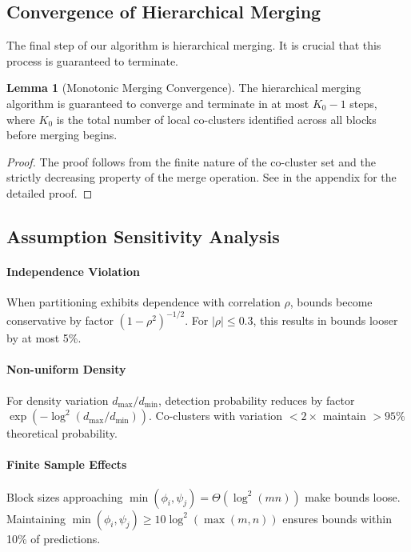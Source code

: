 \documentclass[journal]{IEEEtran}
\theoremstyle{definition}
\newtheorem{lemma}[theorem]{Lemma}
\theoremstyle{remark} %
\begin{document}
{\subsection{Convergence of Hierarchical Merging}
\label{subsec:convergence-of-hierarchical-merging}
The final step of our algorithm is hierarchical merging. It is crucial that this process is guaranteed to terminate.

\begin{lemma}[Monotonic Merging Convergence]
    \label{lem:merging-convergence}
    The hierarchical merging algorithm is guaranteed to converge and terminate in at most $K_0 - 1$ steps, where $K_0$ is the total number of local co-clusters identified across all blocks before merging begins.
\end{lemma}
\begin{proof}
    The proof follows from the finite nature of the co-cluster set and the strictly decreasing property of the merge operation. See  in the appendix for the detailed proof.
\end{proof}

\subsection{Assumption Sensitivity Analysis}
\label{subsec:sensitivity-analysis}

\paragraph{Independence Violation}{When partitioning exhibits dependence with correlation $\rho$, bounds become conservative by factor $(1-\rho^2)^{-1/2}$. For $|\rho| \leq 0.3$, this results in bounds looser by at most 5\%.}

\paragraph{Non-uniform Density}{For density variation $d_{\max}/d_{\min}$, detection probability reduces by factor $\exp(-\log^2(d_{\max}/d_{\min}))$. Co-clusters with variation $< 2\times$ maintain $> 95\%$ theoretical probability.}

\paragraph{Finite Sample Effects}{Block sizes approaching $\min(\phi_i, \psi_j) = \Theta(\log^2(mn))$ make bounds loose. Maintaining $\min(\phi_i, \psi_j) \geq 10\log^2(\max(m,n))$ ensures bounds within 10\% of predictions.}

}
\end{document}
